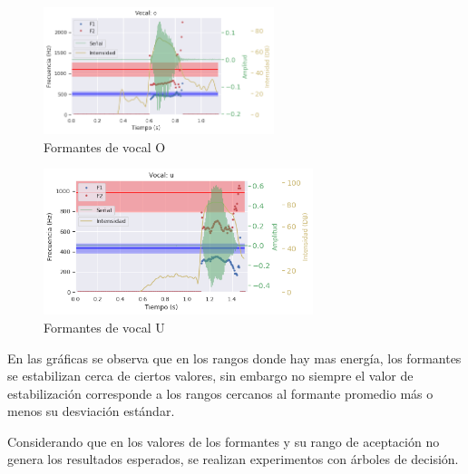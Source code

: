 \begin{figure}[H]
\caption{Formantes de vocal O}
\label{img:formantes_o}
\begin{center}
\includegraphics[width=0.6\textwidth]{imagenes/04_02_o.png}
\end{center}
\end{figure}

\begin{figure}[H]
\caption{Formantes de vocal U}
\label{img:formantes_u}
\begin{center}
\includegraphics[width=0.7\textwidth]{imagenes/04_02_u.png}
\end{center}
\end{figure}


En las gráficas se observa que en los rangos donde hay mas energía, los formantes se estabilizan cerca de ciertos valores, sin embargo no siempre el valor de estabilización corresponde a los rangos cercanos al formante promedio más o menos su desviación estándar.

Considerando que en los valores de los formantes y su rango de aceptación no genera los resultados esperados, se realizan experimentos con árboles de decisión.


